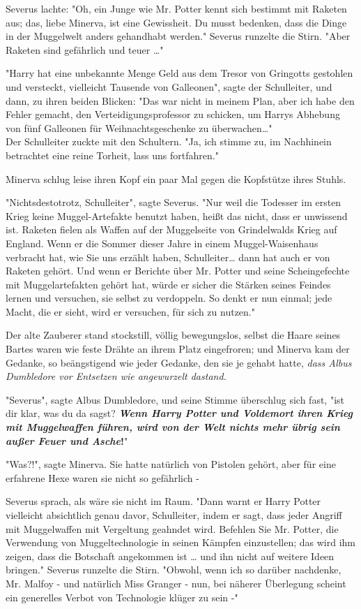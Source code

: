 {Severus lachte: "Oh, ein Junge wie Mr. Potter kennt sich bestimmt mit Raketen aus; das, liebe Minerva, ist eine Gewissheit. Du musst bedenken, dass die Dinge in der Muggelwelt anders gehandhabt werden." Severus runzelte die Stirn. "Aber Raketen sind gefährlich und teuer …"

"Harry hat eine unbekannte Menge Geld aus dem Tresor von Gringotts gestohlen und versteckt, vielleicht Tausende von Galleonen", sagte der Schulleiter, und dann, zu ihren beiden Blicken: "Das war nicht in meinem Plan, aber ich habe den Fehler gemacht, den Verteidigungsprofessor zu schicken, um Harrys Abhebung von fünf Galleonen für Weihnachtsgeschenke zu überwachen…"\\ Der Schulleiter zuckte mit den Schultern. "Ja, ich stimme zu, im Nachhinein betrachtet eine reine Torheit, lass uns fortfahren."

Minerva schlug leise ihren Kopf ein paar Mal gegen die Kopfstütze ihres Stuhls.

"Nichtsdestotrotz, Schulleiter", sagte Severus. "Nur weil die Todesser im ersten Krieg keine Muggel-Artefakte benutzt haben, heißt das nicht, dass er unwissend ist. Raketen fielen als Waffen auf der Muggelseite von Grindelwalds Krieg auf England. Wenn er die Sommer dieser Jahre in einem Muggel-Waisenhaus verbracht hat, wie Sie uns erzählt haben, Schulleiter… dann hat auch er von Raketen gehört. Und wenn er Berichte über Mr. Potter und seine Scheingefechte mit Muggelartefakten gehört hat, würde er sicher die Stärken seines Feindes lernen und versuchen, sie selbst zu verdoppeln. So denkt er nun einmal; jede Macht, die er sieht, wird er versuchen, für sich zu nutzen."

Der alte Zauberer stand stockstill, völlig bewegungslos, selbst die Haare seines Bartes waren wie feste Drähte an ihrem Platz eingefroren; und Minerva kam der Gedanke, so beängstigend wie jeder Gedanke, den sie je gehabt hatte, \emph{dass Albus Dumbledore vor Entsetzen wie angewurzelt dastand.}

"Severus", sagte Albus Dumbledore, und seine Stimme überschlug sich fast, "ist dir klar, was du da sagst? \textbf{\emph{Wenn Harry Potter und Voldemort ihren Krieg mit Muggelwaffen führen, wird von der Welt nichts mehr übrig sein außer Feuer und Asche}!}"

"Was?!", sagte Minerva. Sie hatte natürlich von Pistolen gehört, aber für eine erfahrene Hexe waren sie nicht so gefährlich -

Severus sprach, als wäre sie nicht im Raum. "Dann warnt er Harry Potter vielleicht absichtlich genau davor, Schulleiter, indem er sagt, dass jeder Angriff mit Muggelwaffen mit Vergeltung geahndet wird. Befehlen Sie Mr. Potter, die Verwendung von Muggeltechnologie in seinen Kämpfen einzustellen; das wird ihm zeigen, dass die Botschaft angekommen ist … und ihn nicht auf weitere Ideen bringen." Severus runzelte die Stirn. "Obwohl, wenn ich so darüber nachdenke, Mr. Malfoy - und natürlich Miss Granger - nun, bei näherer Überlegung scheint ein generelles Verbot von Technologie klüger zu sein -"

}
